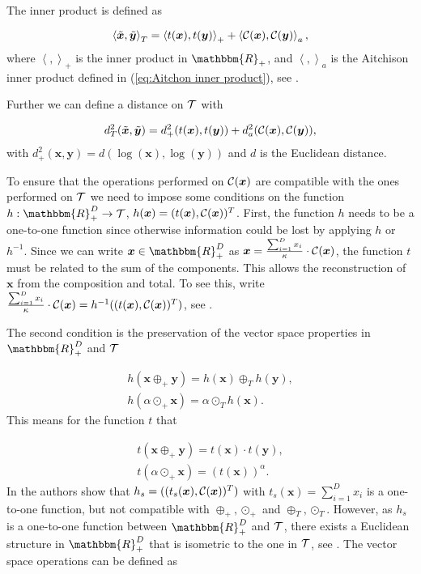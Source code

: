 The inner product is defined as 

\begin{equation}
\left\langle \tilde{\bm{x}},\tilde{\bm{y}} \right\rangle_T = \left\langle t(\bm{x}),t(\bm{y}) \right\rangle_+ + \left\langle \mathcal{C}(\bm{x}),\mathcal{C}(\bm{y}) \right\rangle_a,
\label{eq:inner product Tspace}
\end{equation}
%
where $\left\langle ,\right\rangle_+$ is the inner product in $\mathbbm{R}_+$, and $\left\langle ,\right\rangle_a$ is the Aitchison inner product defined in (\ref{eq:Aitchon inner product}), see \textcite{Pawlowsky:2013}.

Further we can define a distance on $\mathcal{T}$ with 

\begin{gather}
d_T^2(\tilde{\bm{x}},\tilde{\bm{y}}) = d_+^2(t(\bm{x}),t(\bm{y})) + d_a^2(\mathcal{C}(\bm{x}),\mathcal{C}(\bm{y})),
\label{eq:distance Tspace}
\end{gather}
%
with $d_+^2(\bm{x},\bm{y}) = d(\log(\bm{x}),\log(\bm{y}))$ and $d$ is the Euclidean distance. 

To ensure that the operations performed on $\mathcal{C}(\bm{x})$ are compatible with the ones performed on $\mathcal{T}$ we need to impose some conditions on the function $h:\mathbbm{R}_+^D \rightarrow \Tsp$, $h(\bm{x})=(t(\bm{x}),\mathcal{C}(\bm{x}))^T$. First, the function $h$ needs to be a one-to-one function since otherwise information could be lost by applying $h$ or $h^{-1}$. Since we can write $\bm{x} \in \mathbbm{R}_+^D$ as $\bm{x} = \frac{\sum_{i=1}^D x_i}{\kappa} \cdot \mathcal{C}(\bm{x})$, the function $t$ must be related to the sum of the components. This allows the reconstruction of $\bm{x}$ from the composition and total. To see this, write $ \frac{\sum_{i=1}^D x_i}{\kappa} \cdot \mathcal{C}(\bm{x}) = h^{-1}((t(\bm{x}),\mathcal{C}(\bm{x}))^T)$, see \textcite{Pawlowsky:2013}. 

The second condition is the preservation of the vector space properties in $\mathbbm{R}_+^D$ and $\mathcal{T}$

\begin{gather}
h(\bm{x} \oplus_+ \bm{y}) = h(\bm{x}) \oplus_T h(\bm{y}), \\
h(\alpha \odot_+ \bm{x}) = \alpha \odot_T h(\bm{x}). 
\label{eq:Vector Space Properties}
\end{gather}
%
This means for the function $t$ that 

\begin{gather}
t(\bm{x} \oplus_+ \bm{y}) = t(\bm{x}) \cdot t(\bm{y}), \\
t(\alpha \odot_+ \bm{x}) = (t(\bm{x}))^{\alpha}. 
\label{eq:Vector Space Properties for t}
\end{gather}
%
In \textcite{Pawlowsky:2013} the authors show that $h_s=((t_s(\bm{x}),\mathcal{C}(\bm{x}))^T)$ with $t_s(\bm{x}) = \sum_{i=1}^D x_i$ is a one-to-one function, but not compatible with $\oplus_+,\odot_+$ and $\oplus_T,\odot_T$. However, as $h_s$ is a one-to-one function between $\mathbbm{R}_+^D$ and $\mathcal{T}$, there exists a Euclidean structure in $\mathbbm{R}_+^D$ that is isometric to the one in $\mathcal{T}$, see \textcite{Pawlowsky:2013}. The vector space operations can be defined as


